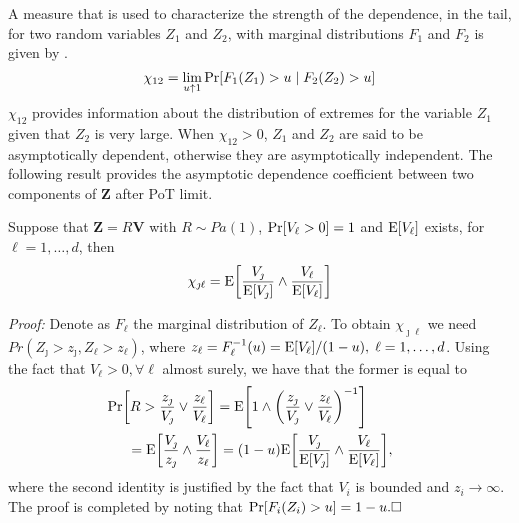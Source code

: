 A measure that is used to characterize the strength of the dependence,
in the tail, for two random variables $Z_1$ and $Z_2$, with marginal
distributions $F_1$ and $F_2$ is given by \citep{coles2001}.
\[
    \chi_{12} = \lim\limits_{u\uparrow 1} \prob{F_1(Z_1)>u\mid F_2(Z_2)>u}  
\]
$\chi_{12}$ provides information about the distribution of extremes for the variable $Z_1$
given that $Z_2$ is very large.  When $\chi_{12}>0$, $Z_1$ and $Z_2$ 
are said to
be asymptotically dependent, otherwise they are asymptotically
independent. The following result provides the asymptotic dependence coefficient between two components of $\bm{Z}$
after PoT limit. 
\begin{prop}\label{ppchi}
Suppose that $\bm{Z} = R\bm{V}$ with $R\sim Pa(1)$,
$\prob{V_\ell > 0} = 1$ and $\expect{V_\ell}$ exists, for $\ell=1, \ldots ,d$, then
\begin{equation}
    \label{eqn:chi_ij}
	\chi_{\jmath\ell} = \expect{\frac{V_\jmath}{\expect{V_\jmath}} \wedge \frac{V_\ell}{\expect{V_\ell}}}
\end{equation}
\end{prop}
{\em Proof:}
Denote as $F_\ell$ the marginal distribution of $Z_\ell$. To obtain $\chi_{\jmath\ell}$ we need $Pr(Z_\jmath>z_\jmath,Z_\ell>z_\ell)$, where $z_\ell =
F_\ell^{-1}(u) = \expect{V_\ell}/(1 - u), \;\ell=1,\dots, d$.
Using the fact that
$V_\ell>0, \forall \ell$ almost surely, we have that the former is equal to
\begin{equation*}
    \begin{aligned}
    &\hspace{-0.5cm}\prob{R>\frac{z_\jmath}{V_\jmath}\vee\frac{z_\ell}{V_\ell}}
    = \expect{1\wedge\left(\frac{z_\jmath}{V_\jmath}\vee\frac{z_\ell}{V_\ell}\right)^{-1}}\\
    &= \expect{\frac{V_\jmath}{z_\jmath}\wedge\frac{V_\ell}{z_\ell}}
    = (1 - u)\expect{\frac{V_\jmath}{\expect{V_\jmath}}\wedge\frac{V_\ell}{\expect{V_\ell}}},
    \end{aligned}
\end{equation*}
where the second identity is justified by the fact that $V_i$ is
bounded and $z_i\rightarrow\infty$. The proof is completed by noting
that $\prob{F_i(Z_i)>u} = 1 - u. \hfill\Box$

